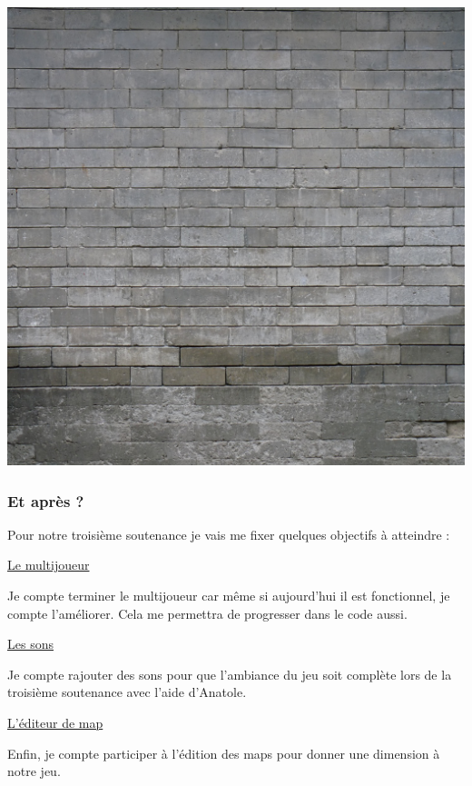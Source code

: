 \documentclass{article}
\begin{document}
\begin{center}
\includegraphics[scale=0.5]{mur_brique.png}
\end{center}
\subsubsection{Et après ?}
\par
Pour notre troisième soutenance je vais me fixer quelques objectifs à atteindre :
\newline

\par
\underline{Le multijoueur}
\newline
\par
Je compte terminer le multijoueur car même si aujourd'hui il est fonctionnel, je compte l'améliorer. Cela me permettra de progresser dans le code aussi.
\newline

\par
\underline{Les sons}
\newline
\par
Je compte rajouter des sons pour que l'ambiance du jeu soit complète lors de la troisième soutenance avec l’aide d’Anatole.
\newline

\par
\underline{L'éditeur de map}
\newline
\par
Enfin, je compte participer à l'édition des maps pour donner une dimension à notre jeu.
\newline
\end{document}
